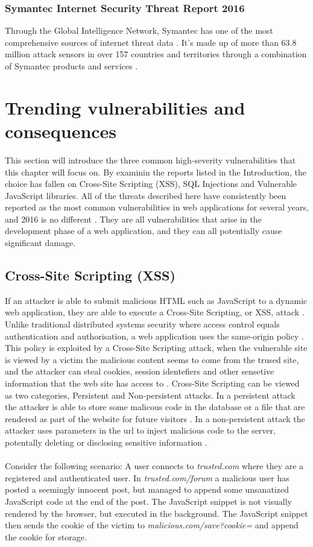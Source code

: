 \subsubsection{Symantec Internet Security Threat Report 2016}
Through the Global Intelligence Network, Symantec has one of the most comprehensive sources of internet threat data \cite{Symantec2016}. It's made up of more than 63.8 million attack sensors in over 157 countries and territories through a combination of Symantec products and services \cite{Symantec2016}.
\pagebreak
\section{Trending vulnerabilities and consequences}
This section will introduce the three common high-severity vulnerabilities that this chapter will focus on. By examinin the reports listed in the Introduction, the choice has fallen on Cross-Site Scripting (XSS), SQL Injections and Vulnerable JavaScript libraries. All of the threats described here have consistently been reported as the most common vulnerabilities in web applications for several years, and 2016 is no different \cite{OWASP2010}\cite{OWASP2013}\cite{Acunetix2016}. They are all vulnerabilities that arise in the development phase of a web application, and they can all potentially cause significant damage. 
\subsection{Cross-Site Scripting (XSS)}
If an attacker is able to submit malicious HTML such as JavaScript to a dynamic web application, they are able to execute a Cross-Site Scripting, or XSS, attack \cite{Kirda2011}. \\
Unlike traditional distributed systems security where access control equals authentication and authorisation, a web application uses the same-origin policy \cite{Gollmann2011}. This policy is exploited by a Cross-Site Scripting attack, when the vulnerable site is viewed by a victim the malicious content seems to come from the trused site, and the attacker can steal cookies, session identefiers and other sensetive information that the web site has access to \cite{Kirda2011}. Cross-Site Scripting can be viewed as two categories, Persistent and Non-persistent attacks. In a persistent attack the attacker is able to store some malicous code in the database or a file that are rendered as part of the website for future visitors \cite{Edmunds2016}. In a non-persistent attack the attacker uses parameters in the url to inject malicious code to the server, potentally deleting or disclosing sensitive information \cite{Edmunds2016}.
\\ \\
Consider the following scenario:
A user connects to \textit{trusted.com} where they are a registered and authenticated user. In \textit{trusted.com/forum} a malicious user has posted a seemingly innocent post, but managed to append some unsanatized JavaScript code at the end of the post. The JavaScript snippet is not visually rendered by the browser, but executed in the background. The JavaScript snippet then sends the cookie of the victim to \textit{malicious.com/save?cookie=} and append the cookie for storage.

